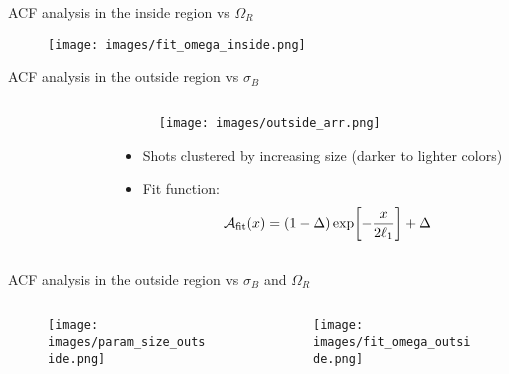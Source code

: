 \documentclass[aspectratio=169]{beamer}
\begin{document}
\begin{frame}{ACF analysis in the inside region vs $\Omega_R$}
  \begin{figure}
      \centering
      \texttt{[image: images/fit\_omega\_inside.png]}
  \end{figure}
\end{frame}

\begin{frame}{ACF analysis in the outside region vs $\sigma_B$}
  \begin{columns}
    \begin{column}{0.55\textwidth}
      \begin{figure}
        \centering
      \end{figure}
    \end{column}
    \begin{column}{0.45\textwidth}
      \begin{figure}
        \centering
        \texttt{[image: images/outside\_arr.png]}
      \end{figure}
      \begin{itemize}
        \item Shots clustered by increasing size (darker to lighter colors)
        \item Fit function:
        \[
          \mathcal{A}_{\rm fit}(x) = (1-\Delta)\exp[-\frac{x}{2\ell_1}] + \Delta
        \]
      \end{itemize}
    \end{column}
  \end{columns}
\end{frame}

\begin{frame}{ACF analysis in the outside region vs $\sigma_B$ and $\Omega_R$}
  \begin{columns}
    \begin{column}{0.5\textwidth}
      \begin{figure}
        \centering
        \texttt{[image: images/param\_size\_outside.png]}
      \end{figure}
    \end{column}
    \begin{column}{0.5\textwidth}
      \begin{figure}
        \centering
        \texttt{[image: images/fit\_omega\_outside.png]}
      \end{figure}
    \end{column}
  \end{columns}
\end{frame}
\end{document}
